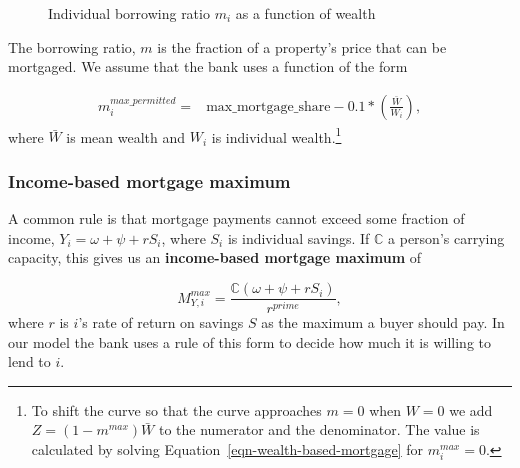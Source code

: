 {    \begin{figure}[htb]
    \begin{center}
    
    \end{center}
    \caption{Individual borrowing ratio $m_i$ as a function of wealth}
    \label{fig-borrowing-ratio}
    \end{figure}


The borrowing ratio, $m$ is the fraction of a property's price that can be mortgaged. We assume that the bank uses a function of the form 


\begin{align}
m_i^{max\_permitted} =& \mathrm{max\_mortgage\_share} - 0.1*\left(\frac{\bar W}{ W_i}\right), \label{eqn-wealth-based-mortgage}  %
\end{align} 
where $\bar{W}$ is mean wealth and $W_i$ is individual wealth.\footnote{To shift the curve  so that the curve approaches $m=0$ when $W=0$ we add  $Z=(1-m^{max})\bar W$ to the numerator and the denominator. The value is calculated by solving Equation~\ref{eqn-wealth-based-mortgage} for {$m_i^{max}=0$}.}


\subsubsection{Income-based mortgage maximum}
A common rule is that mortgage payments cannot exceed some fraction of income, $Y_i=\omega+ \psi + {r}S_i$, where $S_i$ is individual savings.
If $\mathbb{C}$ a person's carrying capacity, this gives us an \textbf{income-based  mortgage maximum} of 


\begin{equation}
M^{max}_{Y,i} = \frac{\mathbb{C} (\omega+ \psi + {r}S_i)}{r^{prime}},\label{eqn-income-based-mortgage}    
\end{equation}
where ${r}$ is $i$'s rate of return on savings $S$ as the maximum a  buyer should pay. %
In our model the bank uses a rule of this form to decide how much it is willing to lend to $i$.

}
